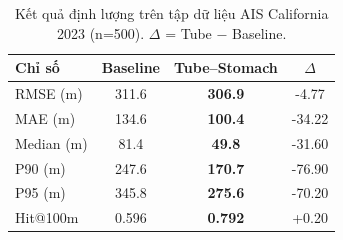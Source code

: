 \documentclass{IEEEtran}
\begin{document}
\begin{table}[H]
\centering
\renewcommand{\arraystretch}{1.2}
\caption{Kết quả định lượng trên tập dữ liệu AIS California 2023 (n=500).
$\Delta$ = Tube $-$ Baseline.}
\label{tab:point-ca-2023}
\begin{tabular}{l
                S[table-format=3.1]
                S[table-format=3.1]
                S[table-format=+3.2]}
\toprule
Chỉ số & {Baseline} & {Tube--Stomach} & {$\Delta$} \\
\midrule
RMSE (m)    & 311.6 & \bfseries 306.9 & -4.77 \\
MAE (m)     & 134.6 & \bfseries 100.4 & -34.22 \\
Median (m)  &  81.4 & \bfseries  49.8 & -31.60 \\
P90 (m)     & 247.6 & \bfseries 170.7 & -76.90 \\
P95 (m)     & 345.8 & \bfseries 275.6 & -70.20 \\
Hit@100m    & 0.596 & \bfseries 0.792 & +0.20 \\
\bottomrule
\end{tabular}
\end{table}
\end{document}
